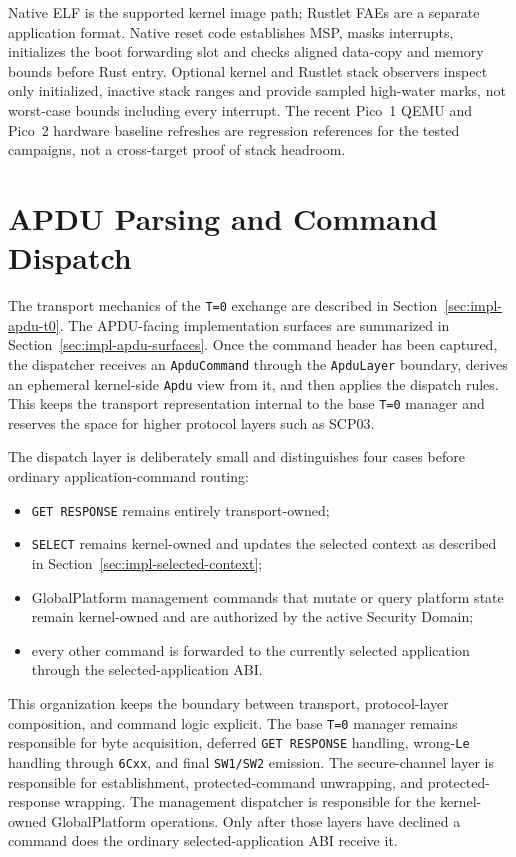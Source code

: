 Native ELF is the supported kernel image path; Rustlet FAEs are a separate
application format. Native reset code establishes MSP, masks interrupts,
initializes the boot forwarding slot and checks aligned data-copy and memory
bounds before Rust entry. Optional kernel and Rustlet stack observers inspect
only initialized, inactive stack ranges and provide sampled high-water marks,
not worst-case bounds including every interrupt. The recent Pico~1 QEMU and
Pico~2 hardware baseline refreshes are regression references for the tested
campaigns, not a cross-target proof of stack headroom.

\section{APDU Parsing and Command Dispatch}
\label{sec:impl-apdu-dispatch}

The transport mechanics of the \texttt{T=0} exchange are described in
Section~\ref{sec:impl-apdu-t0}. The APDU-facing implementation surfaces
are summarized in Section~\ref{sec:impl-apdu-surfaces}. Once the command
header has been captured, the dispatcher receives an
\texttt{ApduCommand} through the \texttt{ApduLayer} boundary, derives an
ephemeral kernel-side \texttt{Apdu} view from it, and then applies the
dispatch rules. This keeps the transport representation internal to the
base \texttt{T=0} manager and reserves the space for higher protocol
layers such as SCP03.

The dispatch layer is deliberately small and distinguishes four cases before
ordinary application-command routing:
\begin{itemize}
\item \texttt{GET RESPONSE} remains entirely transport-owned;
\item \texttt{SELECT} remains kernel-owned and updates the selected
  context as described in Section~\ref{sec:impl-selected-context};
\item GlobalPlatform management commands that mutate or query platform state
  remain kernel-owned and are authorized by the active Security Domain;
\item every other command is forwarded to the currently selected application
  through the selected-application ABI.
\end{itemize}

This organization keeps the boundary between transport, protocol-layer
composition, and command logic explicit. The base \texttt{T=0} manager
remains responsible for byte acquisition, deferred \texttt{GET RESPONSE}
handling, wrong-\texttt{Le} handling through \texttt{6Cxx}, and final
\texttt{SW1/SW2} emission. The secure-channel layer is responsible for
establishment, protected-command unwrapping, and protected-response wrapping.
The management dispatcher is responsible for the kernel-owned GlobalPlatform
operations. Only after those layers have declined a command does the ordinary
selected-application ABI receive it.


